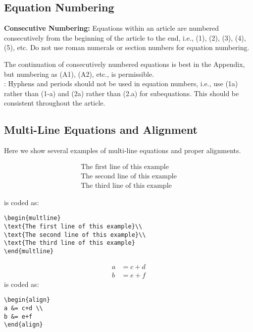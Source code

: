 \documentclass[lettersize,journal]{IEEEtran}
\begin{document}
\subsection{Equation Numbering}
{\bf{Consecutive Numbering:}} Equations within an article are numbered consecutively from the beginning of the
article to the end, i.e., (1), (2), (3), (4), (5), etc. Do not use roman numerals or section numbers for equation numbering.

 The continuation of consecutively numbered equations is best in the Appendix, but numbering
 as (A1), (A2), etc., is permissible.\\

: Hyphens and periods should not be used in equation numbers, i.e., use (1a) rather than
(1-a) and (2a) rather than (2.a) for subequations. This should be consistent throughout the article.

\subsection{Multi-Line Equations and Alignment}
Here we show several examples of multi-line equations and proper alignments.

\begin{multline}
\text{The first line of this example}\\
\text{The second line of this example}\\
\text{The third line of this example}
\end{multline}

\noindent is coded as:
\begin{verbatim}
\begin{multline}
\text{The first line of this example}\\
\text{The second line of this example}\\
\text{The third line of this example}
\end{multline}
\end{verbatim}

\begin{align}
a &= c+d \\
b &= e+f
\end{align}
\noindent is coded as:
\begin{verbatim}
\begin{align}
a &= c+d \\
b &= e+f
\end{align}
\end{verbatim}
\end{document}
